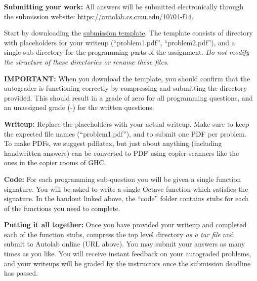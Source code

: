 \documentclass{article}
\begin{document}
\begin{itemize*}
\item \textbf{Submitting your work:} All answers will be submitted electronically through the submission website: \url{https://autolab.cs.cmu.edu/10701-f14}. 
\begin{itemize*}
\item Start by downloading the \href{https://autolab.cs.cmu.edu/10701-f14/attachments/view/229}{submission template}. The template consists of directory with placeholders for your writeup (``problem1.pdf'', ``problem2.pdf''), and a single sub-directory for the programming parts of the assignment. \emph{Do not modify the structure of these directories or rename these files.} 
\item \textbf{IMPORTANT:} When you download the template, you should confirm that the autograder is functioning correctly by compressing and submitting the directory provided. This should result in a grade of zero for all programming questions, and an unassigned grade (-) for the written questions. 
\item \textbf{Writeup:} Replace the placeholders with your actual writeup. Make sure to keep the expected file names (``problem1.pdf''), and to submit one PDF per problem.  To make PDFs, we suggest pdflatex, but just about anything (including handwritten answers) can be converted to PDF using copier-scanners like the ones in the copier rooms of GHC.
\item \textbf{Code:} For each programming sub-question you will be given a single function signature. You will be asked to write a single Octave function which satisfies the signature. In the handout linked above, the ``code'' folder contains stubs for each of the functions you need to complete. 
\item \textbf{Putting it all together:} Once you have provided your writeup and completed each of the function stubs, compress the top level directory \emph{as a tar file} and submit to Autolab online (URL above). You may submit your answers as many times as you like. You will receive instant feedback on your autograded problems, and your writeups will be graded by the instructors once the submission deadline has passed. 
\end{itemize*}





\end{itemize*}

\fi




\end{document}
